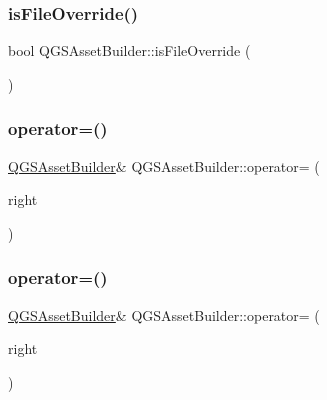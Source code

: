 \mbox{\label{class_q_g_s_asset_builder_aff3fd90286ef3ae16850e70f9de84678}} 
\subsubsection{\texorpdfstring{is\+File\+Override()}{isFileOverride()}}
{\footnotesize\ttfamily bool Q\+G\+S\+Asset\+Builder\+::is\+File\+Override (\begin{DoxyParamCaption}{ }\end{DoxyParamCaption})}

\mbox{\label{class_q_g_s_asset_builder_acc2087600e11b0053cff7aa63a7ec3df}} 
\subsubsection{\texorpdfstring{operator=()}{operator=()}\hspace{0.1cm}{\footnotesize\ttfamily [1/2]}}
{\footnotesize\ttfamily \mbox{\hyperlink{class_q_g_s_asset_builder}{Q\+G\+S\+Asset\+Builder}}\& Q\+G\+S\+Asset\+Builder\+::operator= (\begin{DoxyParamCaption}\item[{const \mbox{\hyperlink{class_q_g_s_asset_builder}{Q\+G\+S\+Asset\+Builder}} \&}]{right }\end{DoxyParamCaption})\hspace{0.3cm}{\ttfamily [delete]}}

\mbox{\label{class_q_g_s_asset_builder_a502f465d07a71127012067a6908e9819}} 
\subsubsection{\texorpdfstring{operator=()}{operator=()}\hspace{0.1cm}{\footnotesize\ttfamily [2/2]}}
{\footnotesize\ttfamily \mbox{\hyperlink{class_q_g_s_asset_builder}{Q\+G\+S\+Asset\+Builder}}\& Q\+G\+S\+Asset\+Builder\+::operator= (\begin{DoxyParamCaption}\item[{\mbox{\hyperlink{class_q_g_s_asset_builder}{Q\+G\+S\+Asset\+Builder}} \&\&}]{right }\end{DoxyParamCaption})\hspace{0.3cm}{\ttfamily [delete]}}

